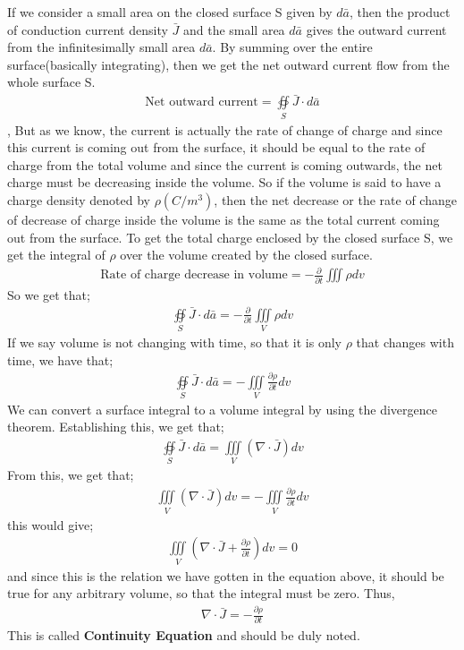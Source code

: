 If we consider a small area on the closed surface S given by $d\bar{a}$, then the product of conduction current density $\bar{J}$ and the small area $d\bar{a}$ gives the outward current from the infinitesimally small area $d\bar{a}$. By summing over the entire surface(basically integrating), then we get the net outward current flow from the whole surface S.
\begin{align*}
\text{Net outward current}= \oiint\limits_S\bar{J}\cdot d\bar{a}
\end{align*},
But as we know, the current is actually the rate of change of charge and since this current is coming out from the surface, it should be equal to the rate of charge from the total volume and since the current is coming outwards, the net charge must be decreasing inside the volume. So if the volume is said to have a charge density denoted by $\rho (C/m^{3})$, then the net decrease or the rate of change of decrease of charge inside the volume is the same as the total current coming out from the surface. To get the total charge enclosed by the closed surface S, we get the integral of $\rho$ over the volume created by the closed surface.
\begin{align*}
\text{Rate of charge decrease in volume}	= -\frac{\partial}{\partial t}\iiint \rho dv
\end{align*}
So we get that;
\begin{align*}
\oiint\limits_S\bar{J}\cdot d\bar{a} = -\frac{\partial}{\partial t}\iiint\limits_V\rho dv
\end{align*}
If we say volume is not changing with time, so that it is only $\rho$ that changes with time, we have that;
\begin{align*}
\oiint\limits_S\bar{J}\cdot d\bar{a} = -\iiint\limits_V\frac{\partial\rho}{\partial t}dv
\end{align*}
We can convert a surface integral to a volume integral by using the divergence theorem. Establishing this, we get that;
\begin{align*}
\oiint\limits_S\bar{J}\cdot d\bar{a} = \iiint\limits_V(\nabla\cdot\bar{J})dv
\end{align*}
From this, we get that;
\begin{align*}
\iiint\limits_V(\nabla\cdot\bar{J})dv = -\iiint\limits_V\frac{\partial\rho}{\partial t}dv
\end{align*}
this would give;
\begin{align*}
\iiint\limits_V(\nabla\cdot\bar{J} + \frac{\partial\rho}{\partial t} )dv = 0
\end{align*}
and since this is the relation we have gotten in the equation above, it should be true for any arbitrary volume, so that the integral must be zero. Thus,
\begin{align}
\nabla\cdot\bar{J} = -\frac{\partial\rho}{\partial t}
\end{align}
This is called \textbf{Continuity Equation} and should be duly noted.

